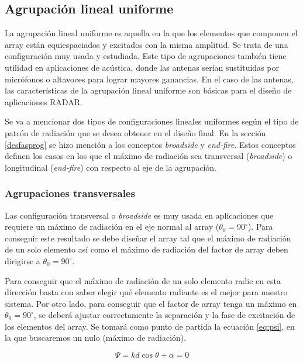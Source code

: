 \subsection{Agrupación lineal uniforme}
\par La agrupación lineal uniforme es aquella en la que los elementos que componen el array están equiespaciados y excitados con la misma amplitud. Se trata de una configuración muy usada y estudiada. Este tipo de agrupaciones también tiene utilidad en aplicaciones de acústica, donde las antenas serían sustituidas por micrófonos o altavoces para lograr mayores ganancias. En el caso de las antenas, las características de la agrupación lineal uniforme son básicas para el diseño de aplicaciones RADAR. 
\\
\par Se va a mencionar dos tipos de configuraciones lineales uniformes según el tipo de patrón de radiación que se desea obtener en el diseño final. En la sección \ref{desfasprog} se hizo mención a los conceptos \textit{broadside} y \textit{end-fire}. Estos conceptos definen los casos en los que el máximo de radiación sea transversal (\textit{broadside}) o longitudinal (\textit{end-fire}) con respecto al eje de la agrupación. \cite{Cardama2002}

\subsubsection{Agrupaciones transversales}

\par Las configuración transversal o \textit{broadside} es muy usada en aplicaciones que requiere un máximo de radiación en el eje normal al array ($\theta_{0}=90^{\circ}$). Para conseguir este resultado se debe diseñar el array tal que el máximo de radiación de un solo elemento así como el máximo de radiación del factor de array deben dirigirse a $\theta_{0}=90^{\circ}$. \cite{Balanis2015} 
\\
\par Para conseguir que el máximo de radiación de un solo elemento radie en esta dirección basta con saber elegir qué elemento radiante es el mejor para nuestro sistema. Por otro lado, para conseguir que el factor de array tenga un máximo en $\theta_{0}=90^{\circ}$, se deberá ajustar correctamente la separación y la fase de excitación de los elementos del array. Se tomará como punto de partida la ecuación \ref{eq:psi}, en la que buscaremos un nulo (máximo de radiación).  

\begin{equation}
	\Psi=kd\cos\theta+\alpha=0
	\label{eq:nulo}
\end{equation}

